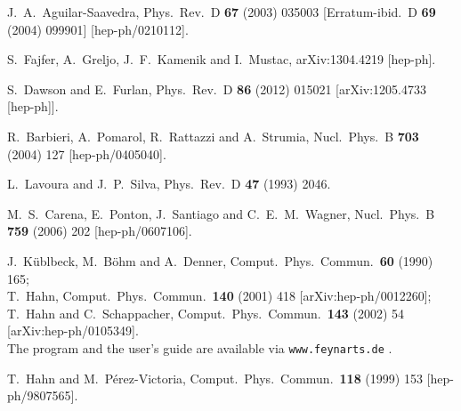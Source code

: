 \documentclass[12pt,a4paper]{article}
\begin{document}
\begin{thebibliography}{99}
  J.~A.~Aguilar-Saavedra,
  Phys.\ Rev.\ D {\bf 67} (2003) 035003
   [Erratum-ibid.\ D {\bf 69} (2004) 099901]
  [hep-ph/0210112].

  S.~Fajfer, A.~Greljo, J.~F.~Kamenik and I.~Mustac,
  arXiv:1304.4219 [hep-ph].
  
  S.~Dawson and E.~Furlan,
  Phys.\ Rev.\ D {\bf 86} (2012) 015021
  [arXiv:1205.4733 [hep-ph]].


  R.~Barbieri, A.~Pomarol, R.~Rattazzi and A.~Strumia,
  Nucl.\ Phys.\ B {\bf 703} (2004) 127
  [hep-ph/0405040].


  L.~Lavoura and J.~P.~Silva,
  Phys.\ Rev.\ D {\bf 47} (1993) 2046.

  M.~S.~Carena, E.~Ponton, J.~Santiago and C.~E.~M.~Wagner,
  Nucl.\ Phys.\ B {\bf 759} (2006) 202
  [hep-ph/0607106].

 J.~K\"ublbeck, M.~B\"ohm and A.~Denner,
                  Comput.\ Phys.\ Commun.\ {\bf 60} (1990) 165;\\
                  T.~Hahn,
                  Comput.\ Phys.\ Commun.\ {\bf 140} (2001) 418
                  [arXiv:hep-ph/0012260];\\
                  T.~Hahn and C.~Schappacher,
                  Comput.\ Phys.\ Commun.\ {\bf 143} (2002) 54
                  [arXiv:hep-ph/0105349].\\
                  The program and the user's guide
                  are available via {\tt www.feynarts.de} .


  T.~Hahn and M.~P\'erez-Victoria,
  Comput.\ Phys.\ Commun.\  {\bf 118} (1999) 153
  [hep-ph/9807565].




\end{thebibliography}
\end{document}
